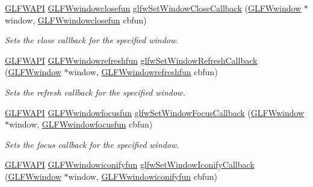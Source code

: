 \begin{DoxyCompactItemize}
\hyperlink{glfw3_8h_a56da5036b2cc259351ae22fd6439bb47}{G\+L\+F\+W\+A\+P\+I} \hyperlink{group__window_ga93e7c2555bd837f4ed8b20f76cada72e}{G\+L\+F\+Wwindowclosefun} \hyperlink{group__window_ga5b827da350141c789acd64f5c4f7a0e1}{glfw\+Set\+Window\+Close\+Callback} (\hyperlink{group__window_ga3c96d80d363e67d13a41b5d1821f3242}{G\+L\+F\+Wwindow} $\ast$window, \hyperlink{group__window_ga93e7c2555bd837f4ed8b20f76cada72e}{G\+L\+F\+Wwindowclosefun} cbfun)
\begin{DoxyCompactList}\small\item\em Sets the close callback for the specified window. \end{DoxyCompactList}\item 
\hyperlink{glfw3_8h_a56da5036b2cc259351ae22fd6439bb47}{G\+L\+F\+W\+A\+P\+I} \hyperlink{group__window_ga7a56f9e0227e2cd9470d80d919032e08}{G\+L\+F\+Wwindowrefreshfun} \hyperlink{group__window_ga9d2621fbc271a0cdc0ce91f9749f46e3}{glfw\+Set\+Window\+Refresh\+Callback} (\hyperlink{group__window_ga3c96d80d363e67d13a41b5d1821f3242}{G\+L\+F\+Wwindow} $\ast$window, \hyperlink{group__window_ga7a56f9e0227e2cd9470d80d919032e08}{G\+L\+F\+Wwindowrefreshfun} cbfun)
\begin{DoxyCompactList}\small\item\em Sets the refresh callback for the specified window. \end{DoxyCompactList}\item 
\hyperlink{glfw3_8h_a56da5036b2cc259351ae22fd6439bb47}{G\+L\+F\+W\+A\+P\+I} \hyperlink{group__window_ga58be2061828dd35080bb438405d3a7e2}{G\+L\+F\+Wwindowfocusfun} \hyperlink{group__window_gac89c6534ba7fbab6f6c68b855656c0d4}{glfw\+Set\+Window\+Focus\+Callback} (\hyperlink{group__window_ga3c96d80d363e67d13a41b5d1821f3242}{G\+L\+F\+Wwindow} $\ast$window, \hyperlink{group__window_ga58be2061828dd35080bb438405d3a7e2}{G\+L\+F\+Wwindowfocusfun} cbfun)
\begin{DoxyCompactList}\small\item\em Sets the focus callback for the specified window. \end{DoxyCompactList}\item 
\hyperlink{glfw3_8h_a56da5036b2cc259351ae22fd6439bb47}{G\+L\+F\+W\+A\+P\+I} \hyperlink{group__window_gad2d4e4c3d28b1242e742e8268b9528af}{G\+L\+F\+Wwindowiconifyfun} \hyperlink{group__window_ga17cd86946117b56c76397530900519db}{glfw\+Set\+Window\+Iconify\+Callback} (\hyperlink{group__window_ga3c96d80d363e67d13a41b5d1821f3242}{G\+L\+F\+Wwindow} $\ast$window, \hyperlink{group__window_gad2d4e4c3d28b1242e742e8268b9528af}{G\+L\+F\+Wwindowiconifyfun} cbfun)

\end{DoxyCompactItemize}
